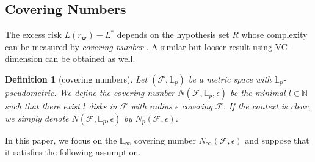 \documentclass[letterpaper]{article} %
\newtheorem{definition}{Definition}
\newcommand{\weight}{\mathbf{w}}
\newcommand{\real}{\mathbb{R}}
\newcommand{\bayeserror}{L^*}
\newcommand{\risk}{L}
\newcommand{\lnorm}{\mathbb{L}}
\newcommand{\red}[1]{\textcolor{red}{#1}}
\newcommand{\todo}[1]{\red{\textsc{todo:} #1}}
\begin{document}
\subsection{Covering Numbers} %
\label{sub:covering number}
The excess risk $\risk{}(r_\weight{})-\bayeserror{}$ depends on the hypothesis set $R$ whose complexity can be measured by \emph{covering number} \cite{cucker2007learning}. 
A similar but looser result using VC-dimension \cite{vapnik1971uniform} can be obtained as well. 

\begin{definition}[covering numbers]
Let $(\mathcal{F}, \lnorm{}_p)$ be a metric space with $\lnorm{}_p$-pseudometric. We define the covering number $N(\mathcal{F},\lnorm{}_p,\epsilon)$ be the minimal $l\in\mathbb{N}$ such that there exist $l$ disks in $\mathcal{F}$ with radius $\epsilon$ covering $\mathcal{F}$. If the context is clear, we simply denote $N(\mathcal{F},\lnorm{}_p, \epsilon)$ by $N_p(\mathcal{F},\epsilon)$.


\end{definition}

In this paper, we focus on the $\lnorm_\infty$ covering number $N_\infty(\mathcal{F},\epsilon)$ and suppose that it satisfies the following assumption.
\end{document}
